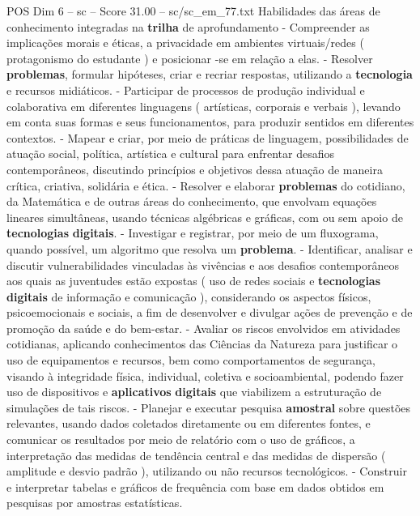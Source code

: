 \begin{textsample}{POS Dim 6 – sc – Score 31.00 – sc/sc\_em\_77.txt}
Habilidades das áreas de conhecimento integradas na \textbf{trilha} de aprofundamento - Compreender as implicações morais e éticas, a privacidade em ambientes virtuais/redes ( protagonismo do estudante ) e posicionar -se em relação a elas. - Resolver \textbf{problemas}, formular hipóteses, criar e recriar respostas, utilizando a \textbf{tecnologia} e recursos midiáticos. - Participar de processos de produção individual e colaborativa em diferentes linguagens ( artísticas, corporais e verbais ), levando em conta suas formas e seus funcionamentos, para produzir sentidos em diferentes contextos. - Mapear e criar, por meio de práticas de linguagem, possibilidades de atuação social, política, artística e cultural para enfrentar desafios contemporâneos, discutindo princípios e objetivos dessa atuação de maneira crítica, criativa, solidária e ética. - Resolver e elaborar \textbf{problemas} do cotidiano, da Matemática e de outras áreas do conhecimento, que envolvam equações lineares simultâneas, usando técnicas algébricas e gráficas, com ou sem apoio de \textbf{tecnologias} \textbf{digitais}. - Investigar e registrar, por meio de um fluxograma, quando possível, um algoritmo que resolva um \textbf{problema}. - Identificar, analisar e discutir vulnerabilidades vinculadas às vivências e aos desafios contemporâneos aos quais as juventudes estão expostas ( uso de redes sociais e \textbf{tecnologias} \textbf{digitais} de informação e comunicação ), considerando os aspectos físicos, psicoemocionais e sociais, a fim de desenvolver e divulgar ações de prevenção e de promoção da saúde e do bem-estar. - Avaliar os riscos envolvidos em atividades cotidianas, aplicando conhecimentos das Ciências da Natureza para justificar o uso de equipamentos e recursos, bem como comportamentos de segurança, visando à integridade física, individual, coletiva e socioambiental, podendo fazer uso de dispositivos e \textbf{aplicativos} \textbf{digitais} que viabilizem a estruturação de simulações de tais riscos. - Planejar e executar pesquisa \textbf{amostral} sobre questões relevantes, usando dados coletados diretamente ou em diferentes fontes, e comunicar os resultados por meio de relatório com o uso de gráficos, a interpretação das medidas de tendência central e das medidas de dispersão ( amplitude e desvio padrão ), utilizando ou não recursos tecnológicos. - Construir e interpretar tabelas e gráficos de frequência com base em dados obtidos em pesquisas por amostras estatísticas.

\end{textsample}

